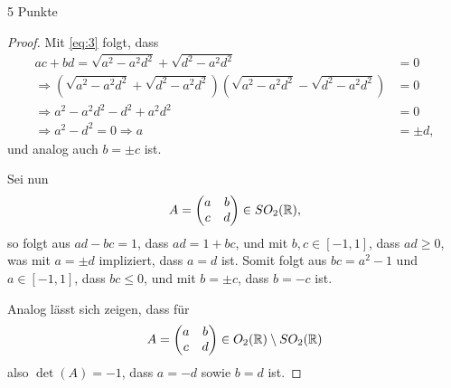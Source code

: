 \documentclass{problemset}
\begin{document}
\begin{problem}{5 Punkte}
\begin{proof}
    Mit \eqref{eq:3} folgt, dass
    \begin{align*}
        ac + bd = \sqrt{a^2 - a^2 d^2} + \sqrt{d^2 - a^2 d^2}                                                                         & = 0      \\
        \Rightarrow \left(\sqrt{a^2 - a^2 d^2} + \sqrt{d^2 - a^2 d^2}\right) \left(\sqrt{a^2 - a^2 d^2} - \sqrt{d^2 - a^2 d^2}\right) & = 0      \\
        \Rightarrow a^2 - a^2 d^2 - d^2 + a^2 d^2                                                                                     & = 0      \\
        \Rightarrow a^2 - d^2 = 0 \Rightarrow a                                                                                       & = \pm d,
    \end{align*}
    und analog auch \(b = \pm c\) ist.

    Sei nun
    \[
        A = \begin{pmatrix}
            a & b \\
            c & d
        \end{pmatrix} \in SO_2(\mathbb{R}),
    \]
    so folgt aus \(ad - bc = 1\), dass \(ad = 1 + bc\), und mit \(b, c \in [-1,
        1]\), dass \(ad \geq 0\), was mit \(a = \pm d\) impliziert, dass \(a = d\) ist.
    Somit folgt aus \(bc = a^2 - 1\) und \(a \in [-1, 1]\), dass \(bc \leq 0\), und
    mit \(b = \pm c\), dass \(b = -c\) ist.

    Analog lässt sich zeigen, dass für
    \[
        A = \begin{pmatrix}
            a & b \\
            c & d
        \end{pmatrix} \in O_2(\mathbb{R}) \setminus SO_2(\mathbb{R})
    \]
    also \(\det(A) = -1\), dass \(a = -d\) sowie \(b = d\) ist.
\end{proof}

\end{problem}
\end{document}
